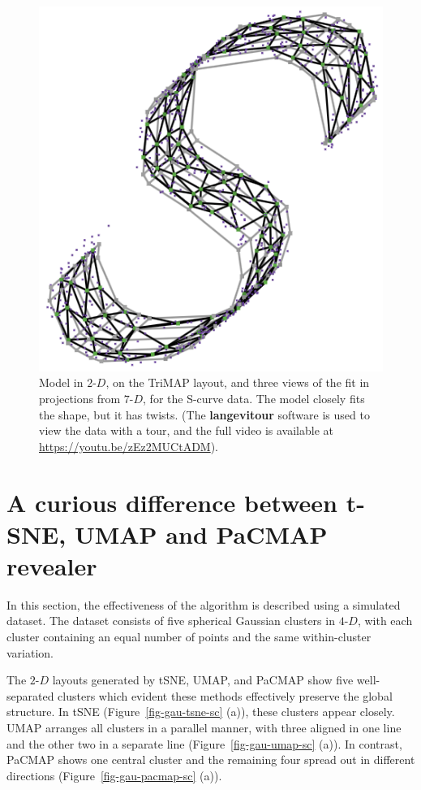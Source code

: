 \documentclass[
  12pt]{article}
\newcommand\gD{$2\text{-}D$}
\begin{document}
\begin{figure}[H]
%
\begin{minipage}{0.25\linewidth}
\includegraphics{figures/scurve/sc_trimap_best_3.png}\end{minipage}%

\caption{\label{fig-scurve-sc-best}Model in \gD{}, on the TriMAP layout,
and three views of the fit in projections from \(7\text{-}D\), for the
S-curve data. The model closely fits the shape, but it has twists. (The
\textbf{langevitour} software is used to view the data with a tour, and
the full video is available at \url{https://youtu.be/zEz2MUCtADM}).}

\end{figure}%

\section{A curious difference between t-SNE, UMAP and PaCMAP
revealer}\label{a-curious-difference-between-t-sne-umap-and-pacmap-revealer}

In this section, the effectiveness of the algorithm is described using a
simulated dataset. The dataset consists of five spherical Gaussian
clusters in \(4\text{-}D\), with each cluster containing an equal number
of points and the same within-cluster variation.

The \gD{} layouts generated by tSNE, UMAP, and PaCMAP show five
well-separated clusters which evident these methods effectively preserve
the global structure. In tSNE (Figure~\ref{fig-gau-tsne-sc} (a)), these
clusters appear closely. UMAP arranges all clusters in a parallel
manner, with three aligned in one line and the other two in a separate
line (Figure~\ref{fig-gau-umap-sc} (a)). In contrast, PaCMAP shows one
central cluster and the remaining four spread out in different
directions (Figure~\ref{fig-gau-pacmap-sc} (a)).
\end{document}

